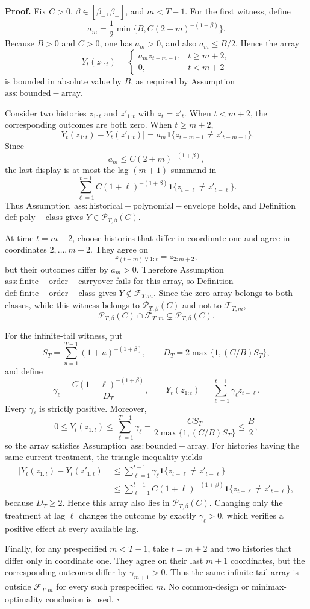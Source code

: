 \textbf{Proof.} Fix \(C>0\), \(\beta\in[\beta_-,\beta_+]\), and \(m<T-1\). For the first witness, define
\[
a_m=\frac12\min\{B,C(2+m)^{-(1+\beta)}\}.
\]
Because \(B>0\) and \(C>0\), one has \(a_m>0\), and also \(a_m\le B/2\). Hence the array
\[
Y_t(z_{1:t})=
\begin{cases}
a_m z_{t-m-1},&t\ge m+2,\\
0,&t<m+2
\end{cases}
\]
is bounded in absolute value by \(B\), as required by Assumption~\(\mathrm{ass:bounded-array}\).

Consider two histories \(z_{1:t}\) and \(z'_{1:t}\) with \(z_t=z'_t\). When \(t<m+2\), the corresponding outcomes are both zero. When \(t\ge m+2\),
\[
\lvert Y_t(z_{1:t})-Y_t(z'_{1:t})\rvert
=a_m\mathbf 1\{z_{t-m-1}\ne z'_{t-m-1}\}.
\]
Since
\[
a_m\le C(2+m)^{-(1+\beta)},
\]
the last display is at most the lag-\((m+1)\) summand in
\[
\sum_{\ell=1}^{t-1}C(1+\ell)^{-(1+\beta)}
\mathbf 1\{z_{t-\ell}\ne z'_{t-\ell}\}.
\]
Thus Assumption~\(\mathrm{ass:historical-polynomial-envelope}\) holds, and Definition~\(\mathrm{def:poly-class}\) gives \(Y\in\mathcal P_{T,\beta}(C)\).

At time \(t=m+2\), choose histories that differ in coordinate one and agree in coordinates \(2,\ldots,m+2\). They agree on
\[
z_{(t-m)\vee1:t}=z_{2:m+2},
\]
but their outcomes differ by \(a_m>0\). Therefore Assumption~\(\mathrm{ass:finite-order-carryover}\) fails for this array, so Definition~\(\mathrm{def:finite-order-class}\) gives \(Y\notin\mathcal F_{T,m}\). Since the zero array belongs to both classes, while this witness belongs to \(\mathcal P_{T,\beta}(C)\) and not to \(\mathcal F_{T,m}\),
\[
\mathcal P_{T,\beta}(C)\cap\mathcal F_{T,m}
\subsetneq\mathcal P_{T,\beta}(C).
\]

For the infinite-tail witness, put
\[
S_T=\sum_{u=1}^{T-1}(1+u)^{-(1+\beta)},
\qquad
D_T=2\max\{1,(C/B)S_T\},
\]
and define
\[
\gamma_\ell=\frac{C(1+\ell)^{-(1+\beta)}}{D_T},
\qquad
Y_t(z_{1:t})=\sum_{\ell=1}^{t-1}\gamma_\ell z_{t-\ell}.
\]
Every \(\gamma_\ell\) is strictly positive. Moreover,
\[
0\le Y_t(z_{1:t})
\le\sum_{\ell=1}^{T-1}\gamma_\ell
=\frac{CS_T}{2\max\{1,(C/B)S_T\}}
\le\frac B2,
\]
so the array satisfies Assumption~\(\mathrm{ass:bounded-array}\). For histories having the same current treatment, the triangle inequality yields
\[
\begin{aligned}
\lvert Y_t(z_{1:t})-Y_t(z'_{1:t})\rvert
&\le\sum_{\ell=1}^{t-1}\gamma_\ell
\mathbf 1\{z_{t-\ell}\ne z'_{t-\ell}\}\\
&\le\sum_{\ell=1}^{t-1}C(1+\ell)^{-(1+\beta)}
\mathbf 1\{z_{t-\ell}\ne z'_{t-\ell}\},
\end{aligned}
\]
because \(D_T\ge2\). Hence this array also lies in \(\mathcal P_{T,\beta}(C)\). Changing only the treatment at lag \(\ell\) changes the outcome by exactly \(\gamma_\ell>0\), which verifies a positive effect at every available lag.

Finally, for any prespecified \(m<T-1\), take \(t=m+2\) and two histories that differ only in coordinate one. They agree on their last \(m+1\) coordinates, but the corresponding outcomes differ by \(\gamma_{m+1}>0\). Thus the same infinite-tail array is outside \(\mathcal F_{T,m}\) for every such prespecified \(m\). No common-design or minimax-optimality conclusion is used. \(\square\)